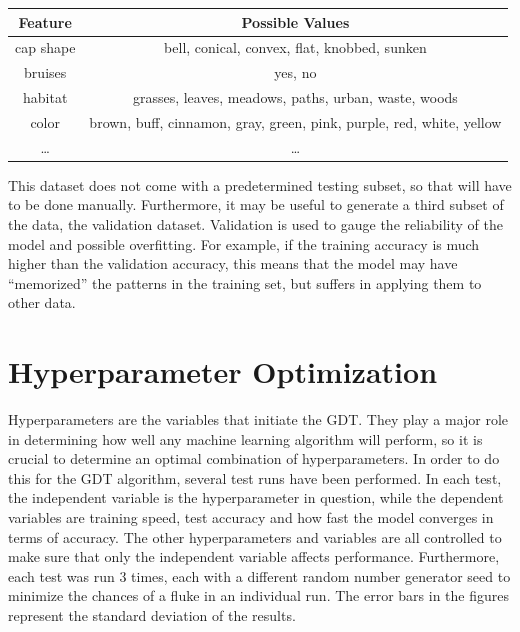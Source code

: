 \documentclass[12pt]{article}
\begin{document}
\begin{center}
    \begin{tabular}{|c|c|}
        \hline
        Feature & Possible Values \\
        \hline \hline
        cap shape & bell, conical, convex, flat, knobbed, sunken \\
        \hline
        bruises & yes, no \\
        \hline
        habitat & grasses, leaves, meadows, paths, urban, waste, woods \\
        \hline
        color & brown, buff, cinnamon, gray, green, pink, purple, red, white, yellow \\
        \hline
        \dots & \dots \\
        \hline
    \end{tabular}
\end{center}

This dataset does not come with a predetermined testing subset, so that will have to be done manually. Furthermore, it may be useful to generate a third subset of the data, the validation dataset. Validation is used to gauge the reliability of the model and possible overfitting. For example, if the training accuracy is much higher than the validation accuracy, this means that the model may have ``memorized'' the patterns in the training set, but suffers in applying them to other data.

\section{Hyperparameter Optimization}

Hyperparameters are the variables that initiate the GDT. They play a major role in determining how well any machine learning algorithm will perform, so it is crucial to determine an optimal combination of hyperparameters. In order to do this for the GDT algorithm, several test runs have been performed. In each test, the independent variable is the hyperparameter in question, while the dependent variables are training speed, test accuracy and how fast the model converges in terms of accuracy. The other hyperparameters and variables are all controlled to make sure that only the independent variable affects performance. Furthermore, each test was run $3$ times, each with a different random number generator seed to minimize the chances of a fluke in an individual run. The error bars in the figures represent the standard deviation of the results.
\end{document}
